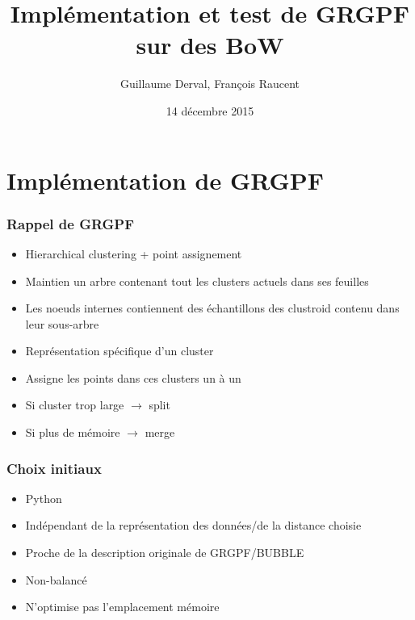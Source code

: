 \documentclass{beamer}
\title{Implémentation et test de GRGPF sur des BoW}
\date{14 décembre 2015}
\author{Guillaume Derval, François Raucent}
\begin{document}
  \maketitle
  \tableofcontents
  \section{Implémentation de GRGPF}
  \begin{frame}
  	\frametitle{Rappel de GRGPF}
  	\begin{itemize}
  		\item Hierarchical clustering + point assignement
  		\item Maintien un arbre contenant tout les clusters actuels dans ses feuilles
  		\item Les noeuds internes contiennent des échantillons des clustroid contenu dans leur sous-arbre
  		\item Représentation spécifique d'un cluster
  		\item Assigne les points dans ces clusters un à un
  		\item Si cluster trop large $\rightarrow$ split
  		\item Si plus de mémoire $\rightarrow$ merge
  	\end{itemize}
  \end{frame}
  \begin{frame}
  	\frametitle{Choix initiaux}
  	\begin{itemize}
  		\item Python
  		\item Indépendant de la représentation des données/de la distance choisie
  		\item Proche de la description originale de GRGPF/BUBBLE
  		\item \alert{Non-balancé}
  		\item \alert{N'optimise pas l'emplacement mémoire}
  	\end{itemize}
  \end{frame}
  
 	
\end{document}
